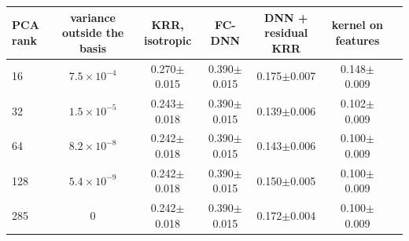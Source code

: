 \begin{tabular}{lcccccc}
\toprule
PCA rank & variance outside the basis & KRR, isotropic & FC-DNN & DNN + residual KRR & kernel on features \\
\midrule
16 & $7.5\times10^{-4}$ & 0.270$\pm$0.015 & 0.390$\pm$0.015 & 0.175$\pm$0.007 & 0.148$\pm$0.009 \\
32 & $1.5\times10^{-5}$ & 0.243$\pm$0.018 & 0.390$\pm$0.015 & 0.139$\pm$0.006 & 0.102$\pm$0.009 \\
64 & $8.2\times10^{-8}$ & 0.242$\pm$0.018 & 0.390$\pm$0.015 & 0.143$\pm$0.006 & 0.100$\pm$0.009 \\
128 & $5.4\times10^{-9}$ & 0.242$\pm$0.018 & 0.390$\pm$0.015 & 0.150$\pm$0.005 & 0.100$\pm$0.009 \\
285 & $0$ & 0.242$\pm$0.018 & 0.390$\pm$0.015 & 0.172$\pm$0.004 & 0.100$\pm$0.009 \\
\bottomrule
\end{tabular}
